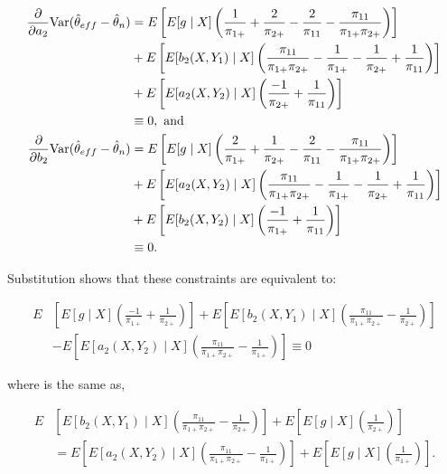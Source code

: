 \begin{itemize}
    \begin{align*}
      \frac{\partial}{\partial a_2} {\text{Var}}(\hat \theta_{eff} - \hat \theta_n)
      &= E\left[E[g \mid X] \left(\frac{1}{\pi_{1+}} + \frac{2}{\pi_{2+}} -
      \frac{2}{\pi_{11}} - \frac{\pi_{11}}{\pi_{1+} \pi_{2+}}\right)\right] \\
      &+ E\left[E[b_2(X, Y_1) \mid X] \left(\frac{\pi_{11}}{\pi_{1+} \pi_{2+}} -
      \frac{1}{\pi_{1+}} - \frac{1}{\pi_{2+}} +
      \frac{1}{\pi_{11}}\right)\right]\\
      &+ E\left[ E[a_2(X, Y_2) \mid X] \left(\frac{-1}{\pi_{2+}} +
      \frac{1}{\pi_{11}}\right)\right]\\
      &\equiv 0, \text{ and }\\
      \frac{\partial}{\partial b_2} {\text{Var}}(\hat \theta_{eff} - \hat \theta_n)
      &= E\left[E[g \mid X] \left(\frac{2}{\pi_{1+}} + \frac{1}{\pi_{2+}} -
      \frac{2}{\pi_{11}} - \frac{\pi_{11}}{\pi_{1+}\pi_{2+}}\right)\right]\\
      &+ E\left[E[a_2(X, Y_2) \mid X] \left(\frac{\pi_{11}}{\pi_{1+} \pi_{2+}} -
      \frac{1}{\pi_{1+}} - \frac{1}{\pi_{2+}} +
      \frac{1}{\pi_{11}}\right)\right]\\
      &+ E\left[ E[b_2(X, Y_2) \mid X] \left(\frac{-1}{\pi_{1+}} +
      \frac{1}{\pi_{11}}\right)\right]\\
      &\equiv 0. 
    \end{align*}


    Substitution shows that these constraints are equivalent to:

    \begin{align*}
      E&\left[E[g \mid X] \left(\frac{-1}{\pi_{1+}} +
    \frac{1}{\pi_{2+}}\right)\right] + E\left[ E[b_2(X, Y_1) \mid X]
    \left(\frac{\pi_{11}}{\pi_{1+} \pi_{2+}} -\frac{1}{\pi_{2+}}\right)\right]\\
      &- E\left[E[a_2(X, Y_2) \mid X] \left(\frac{\pi_{11}}{\pi_{1+} \pi_{2+}} - 
    \frac{1}{\pi_{1+}}\right)\right] \equiv 0
    \end{align*}

    where is the same as,

    \begin{align*}
      E&\left[ E[b_2(X, Y_1) \mid X] \left(\frac{\pi_{11}}{\pi_{1+} \pi_{2+}} -
    \frac{1}{\pi_{2+}}\right) \right] + E\left[E[g \mid X]
      \left(\frac{1}{\pi_{2+}}\right)\right] \\
      &=
    E\left[ E[a_2(X, Y_2) \mid X] \left(\frac{\pi_{11}}{\pi_{1+} \pi_{2+}} -
    \frac{1}{\pi_{1+}}\right) \right] + E\left[E[g \mid X]
    \left(\frac{1}{\pi_{1+}}\right)\right].
    \end{align*}


\end{itemize}
